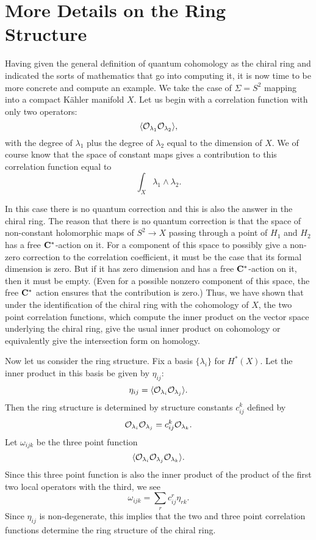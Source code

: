 \section{More Details on the Ring Structure}

Having given the general definition of quantum cohomology as the
chiral ring and indicated the sorts of mathematics that go into
computing it, it is now time to be more concrete and compute an
example. We take the case of $\Sigma=S^2$ mapping into a compact
K\"ahler manifold $X$.
Let us begin with a correlation function with only two operators:
$$\langle {\cal O}_{\lambda_1}{\cal O}_{\lambda_2}\rangle,$$
with the degree of $\lambda_1$ plus the degree of $\lambda_2$ equal to
the dimension of $X$.
We of course know that the space of constant maps  gives a
contribution to this correlation function equal to
$$\int_X\lambda_1\wedge\lambda_2.$$

In this case there is no quantum correction and this is also the answer
in the chiral ring. The reason that there is no quantum correction is
that the space of non-constant holomorphic maps of $S^2\to X$
passing through a point of $H_1$ and $H_2$ has a free ${\bf
C}^*$-action on it. For a component of this space to possibly give a
non-zero correction to the correlation coefficient, it must be the
case that its formal dimension is zero. But if it has zero dimension
and has a free ${\bf C}^*$-action on it, then it must be empty.
(Even for a possible nonzero component of this space, the free ${\bf C}^*$
action ensures that the contribution is zero.)
Thus, we have shown that under the identification of the chiral ring
with the cohomology of $X$,  the two point correlation functions, which
compute the  inner product on the vector space underlying the chiral
ring, give the usual inner product on cohomology or equivalently give
the intersection form on homology.

Now let us consider the ring structure. Fix a basis $\{\lambda_i\}$
for $H^*(X)$.
Let the inner product in this basis be given by $\eta_{ij}$:
$$\eta_{ij}=\langle{\cal O}_{\lambda_i}{\cal O}_{\lambda_j}\rangle.$$
Then the ring structure is determined by structure constants
$c_{ij}^k$ defined by
$${\cal O}_{\lambda_i}{\cal O}_{\lambda_j}=c_{ij}^k{\cal
O}_{\lambda_k}.$$
Let
$\omega_{ijk}$ be the three point function
$$\langle{\cal O}_{\lambda_i}{\cal O}_{\lambda_j}{\cal
O}_{\lambda_k}\rangle.$$
Since this three point function is also the inner product of the
product of the first two local operators with the third, we see
$$\omega_{ijk}=\sum_rc_{ij}^r\eta_{rk}.$$
Since $\eta_{ij}$ is non-degenerate, this implies that the two and
three point correlation functions determine the ring structure of the
chiral ring.


